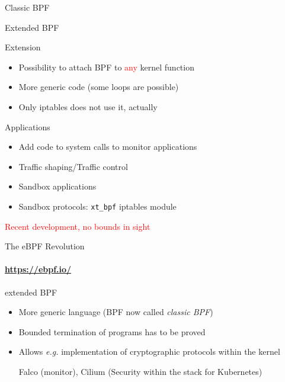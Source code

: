 \begin{reveals}
\begin{frame}[c,fragile]{Classic BPF}
\end{frame}

\begin{frame}[c]{Extended BPF}

  \begin{block}{Extension}
    \begin{itemize}
    \item Possibility to attach BPF to \textcolor{red}{any} kernel
      function
    \item More generic code (some loops are possible)
    \item Only iptables does not use it, actually
    \end{itemize}
  \end{block}
  
  \vfill

  \begin{block}{Applications}
    \begin{itemize}
    \item Add code to system calls to monitor applications
    \item Traffic shaping/Traffic control
    \item Sandbox applications
    \item Sandbox protocols: \texttt{xt\_bpf} iptables module
    \end{itemize}
  \end{block}

  \vfill

  \begin{center}
    \textcolor{red}{Recent development, no bounds in sight}
  \end{center}
\end{frame}



\begin{frame}[c]{The eBPF Revolution}
  \framesubtitle{\url{https://ebpf.io/}}
  
  \begin{block}{extended BPF}
    \begin{itemize}
    \item More generic language (BPF now called \emph{classic BPF})
    \item Bounded termination of programs has to be proved
    \item Allows \textit{e.g.} implementation of cryptographic
      protocols within the kernel
      \begin{center}
        Falco (monitor), Cilium (Security within the stack for Kubernetes)
      \end{center}
    \end{itemize}
  \end{block}


\end{frame}
\end{reveals}

